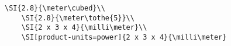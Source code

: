 \lstset{language=[LaTeX]TeX } %
\begin{lstlisting}[gobble=2, frame=none, numbers=none, backgroundcolor=\color{white},%
	caption={},label={code:}]
	\SI{2.8}{\meter\cubed}\\
	\SI{2.8}{\meter\tothe{5}}\\
	\SI{2 x 3 x 4}{\milli\meter}\\
	\SI[product-units=power]{2 x 3 x 4}{\milli\meter}
\end{lstlisting}


